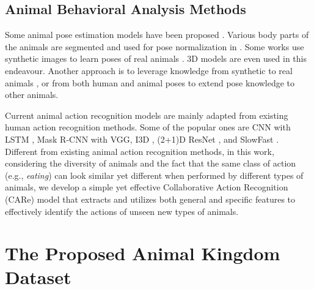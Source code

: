 \documentclass[10pt,twocolumn,letterpaper]{article}
\begin{document}
\begin{table*}[t]
{\begin{tabular}{|c||c||c|l|c|l|c|c||c||c|c||c|c||c||c|c|c|l|c|c|c|l|c||c|c|c|c|}
    \hline
    \end{tabular}
    }
    
    
    \vspace{-0.5cm}
    \end{table*}
    
    
    
    
    
    
    
    
    
    \subsection{Animal Behavioral Analysis Methods}
    Some animal pose estimation models have been proposed \cite{mathis2018deeplabcut, pereira2019fast, graving2019deepposekit, karashchuk2021anipose}. Various body parts of the animals are segmented and used for pose normalization in \cite{tang2020revisiting}. Some works use synthetic images to learn poses of real animals \cite{li2020deformation, li2021synthetic,shooter2021sydog}. 3D models \cite{mu2020learning, zuffi20173d} are even used in this endeavour. Another approach is to leverage knowledge from synthetic to real animals \cite{li2021synthetic}, or from both human and animal poses \cite{cao2019cross} to extend pose knowledge to other animals. 
    
    Current animal action recognition models are mainly adapted from existing human action recognition methods. Some of the popular ones are CNN \cite{bohnslav2021deepethogram} with LSTM \cite{owoeye2018online, liu2020computer}, Mask R-CNN \cite{ani11020485, schindler2021identification} with VGG\cite{ani11020485}, I3D \cite{liwildlife}, (2+1)D ResNet \cite{schindler2021identification}, and SlowFast \cite{schindler2021identification}. Different from existing animal action recognition methods, in this work, considering 
    the diversity of animals and the fact that the same class of action (e.g., \textit{eating}) can look similar yet different when performed by different types of animals, we develop a simple yet effective Collaborative Action Recognition (CARe) model that extracts and utilizes both general and specific features to effectively identify the actions of unseen new types of animals.   
    
    \vspace{-0.2cm}
    \section{The Proposed Animal Kingdom Dataset}
\end{document}
